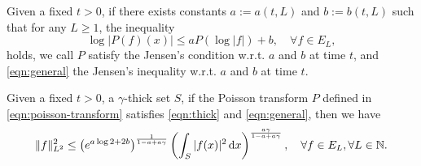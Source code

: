 \begin{definition}
	Given a fixed $t>0$, if there exists constants $a:=a(t,L)$ and $b:=b(t,L)$ such that for any $L\ge 1$, the inequality 
	 \begin{equation}
		 \log \left| P(f)(x) \right| \le a P(\log|f|)+b, \quad \forall f\in E_L, \label{eqn:general} 
	\end{equation}
	holds, we call $P$ satisfy the Jensen's condition w.r.t. $a$ and $b$ at time $t$, and \cref{eqn:general} the Jensen's inequality w.r.t. $a$ and $b$ at time $t$. 
\end{definition}


\begin{theorem}
	Given a fixed $t>0$, a $\gamma$-thick set $S$, if the Poisson transform $P$ defined in \cref{eqn:poisson-transform} satisfies \cref{eqn:thick} and \cref{eqn:general}, then we have 
\begin{equation}
	\|f\|_{L^2}^2\le  \left(e^{a\log 2+2b}\right)^{\frac{1}{1-a+a\gamma} }\left( \int_S|f(x)|^2\,\mathrm{d} x \right) ^{\frac{a \gamma}{1-a+a\gamma}}, \quad \forall f\in E_L,\forall L \in \mathbb{N}.
\end{equation}
\end{theorem}
